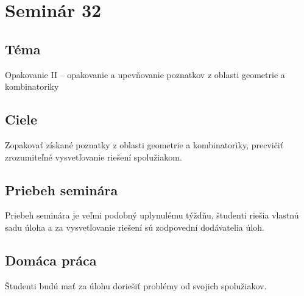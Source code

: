 \section*{Seminár 32}


\subsection*{Téma}
Opakovanie II -- opakovanie a upevňovanie poznatkov z oblasti geometrie a kombinatoriky

\subsection*{Ciele}
Zopakovať získané poznatky z oblasti geometrie a kombinatoriky, precvičiť zrozumiteľné vysvetľovanie riešení spolužiakom.

\subsection*{Priebeh seminára}
Priebeh seminára je veľmi podobný uplynulému týždňu, študenti riešia vlastnú sadu úloha a za vysvetľovanie riešení sú zodpovední dodávatelia úloh.

\subsection*{Domáca práca}
Študenti budú mať za úlohu doriešiť problémy od svojich spolužiakov.

